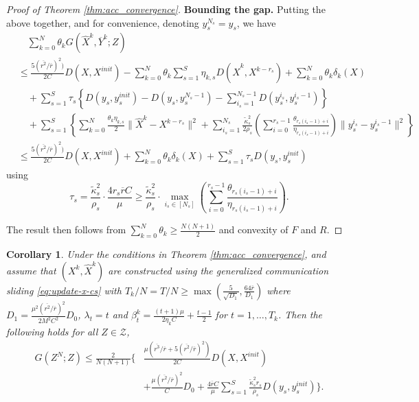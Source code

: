 \documentclass[10pt]{article}
\newcommand{\mc}{\mathcal}
\newtheorem{corollary}{Corollary}[section]
\begin{document}
\begin{proof}[Proof of Theorem \ref{thm:acc_convergence}]
\textbf{Bounding the gap.}
Putting the above together, and for convenience, denoting $y_s^{N_s} = y_s$, we have
\begin{align*}
    &\quad \sum_{k=0}^N \theta_kG(\widehat{X}^k,\overline{Y}^k;Z)\\
     &\leq \frac{5(\overline{r^2}/\overline{r})^2)}{2C}D(X,X^{init})-\sum_{k=0}^N\theta_k\sum_{s=1}^S  \eta_{k,s} D(\widehat{X}^k,X^{k-r_s})+\sum_{k=0}^N\theta_k\delta_k(X)\\
     &\quad + \sum_{s=1}^S\tau_s\left\{D(y_s,y_s^{init}) - D(y_s,y_s^{N_s-1})-\sum_{i_s=1}^{N_s-1} D(y^{i_s}_s,y_s^{i_s-1})\right\}\\
     &\quad + \sum_{s=1}^S \left\{\sum_{k=0}^N\frac{\theta_k\eta_{k,s}}{2}\|\widehat{X}^k - X^{k-r_s}\|^2 +\sum_{i_s=1}^{N_s}\frac{\widetilde{\kappa}_s^2}{2\rho_s}(\sum_{i=0}^{r_s-1}\frac{\theta_{r_s(i_s-1)+i}}{\eta_{r_s(i_s-1)+i}})\|y_s^{i_s} - y_s^{i_s-1}\|^2\right\}\\
    &\leq \frac{5(\overline{r^2}/\overline{r})^2)}{2C}D(X,X^{init})+\sum_{k=0}^N\theta_k\delta_k(X)+ \sum_{s=1}^S\tau_{s}D(y_s,y_s^{init}) 
\end{align*}
using 
\begin{displaymath}
    \tau_s = \frac{\widetilde{\kappa}_s^2}{\rho_s}\cdot\frac{4r_s\overline{r}C}{\mu}\geq \frac{\widetilde{\kappa}_s^2}{\rho_s}\cdot \max_{i_s\in [N_s]}(\sum_{i=0}^{r_s-1}\frac{\theta_{r_s(i_s-1)+i}}{\eta_{r_s(i_s-1)+i}}). 
\end{displaymath}

The result then follows from $\sum_{k=0}^N \theta_k\geq \frac{N(N+1)}{2}$ and convexity of $F$ and $R$. 


\end{proof}









\begin{corollary}\label{cor:acc_convergence}
    Under the conditions in Theorem \ref{thm:acc_convergence}, and assume that $(X^k,\widehat{X}^k)$ are constructed using the generalized communication sliding \eqref{eq:update-x-cs} with $T_k/N = T/N\geq \max(\frac{5}{\sqrt{D_1}},\frac{64\overline{r}}{D_1})$ where $D_1 = \frac{\mu^2(\overline{r^2}/\overline{r})^2}{2M^2C^2}D_0$, $\lambda_t = t$ and $\beta^k_t = \frac{(t+1)\mu}{2\eta_kC} + \frac{t-1}{2}$ for $t = 1,\ldots,T_k$. Then the following holds for all $Z\in \mc Z$, 
\begin{align*}
     G(Z^N;Z) \leq \frac{2}{N(N+1)}\biggl\{&\frac{\mu(\overline{r^3}/\overline{r} + 5(\overline{r^2}/\overline{r})^2)}{2C}D(X,X^{init})\\
     &+ \frac{\mu (\overline{r^2}/\overline{r})^2}{C}D_0 + \frac{4\overline{r}C}{\mu}\sum_{s=1}^S\frac{\widetilde{\kappa}_s^2r_s}{\rho_s}D(y_s,y_s^{init}) \biggr\}.
\end{align*}
\end{corollary}
\end{document}

